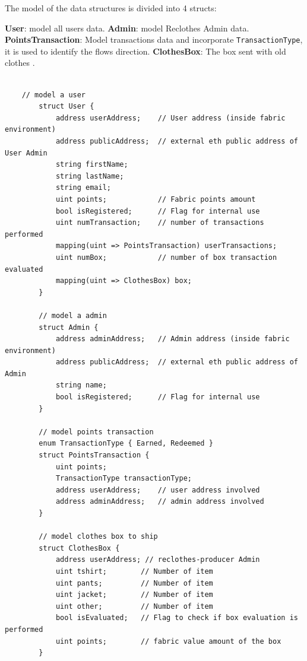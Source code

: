 The model of the data structures is divided into 4 structs:

\begin{outline}[enumerate]
    \1 \textbf{User}: model all users data.
    \1 \textbf{Admin}: model Reclothes Admin data.
    \1 \textbf{PointsTransaction}: Model transactions data and incorporate \texttt{TransactionType}, it is used to identify the flows direction.
    \1 \textbf{ClothesBox}: The box sent with old clothes .
\end{outline}

\begin{lstlisting}[language=Solidity]
       
    // model a user
        struct User {
            address userAddress;    // User address (inside fabric environment)
            address publicAddress;  // external eth public address of User Admin
            string firstName;
            string lastName;
            string email;
            uint points;            // Fabric points amount
            bool isRegistered;      // Flag for internal use
            uint numTransaction;    // number of transactions performed
            mapping(uint => PointsTransaction) userTransactions;
            uint numBox;            // number of box transaction evaluated
            mapping(uint => ClothesBox) box;
        }
    
        // model a admin
        struct Admin {
            address adminAddress;   // Admin address (inside fabric environment)
            address publicAddress;  // external eth public address of Admin
            string name;
            bool isRegistered;      // Flag for internal use
        }
    
        // model points transaction
        enum TransactionType { Earned, Redeemed }
        struct PointsTransaction {
            uint points;
            TransactionType transactionType;
            address userAddress;    // user address involved
            address adminAddress;   // admin address involved
        }
    
        // model clothes box to ship
        struct ClothesBox {
            address userAddress; // reclothes-producer Admin
            uint tshirt;        // Number of item
            uint pants;         // Number of item
            uint jacket;        // Number of item
            uint other;         // Number of item
            bool isEvaluated;   // Flag to check if box evaluation is performed
            uint points;        // fabric value amount of the box
        }
\end{lstlisting}

